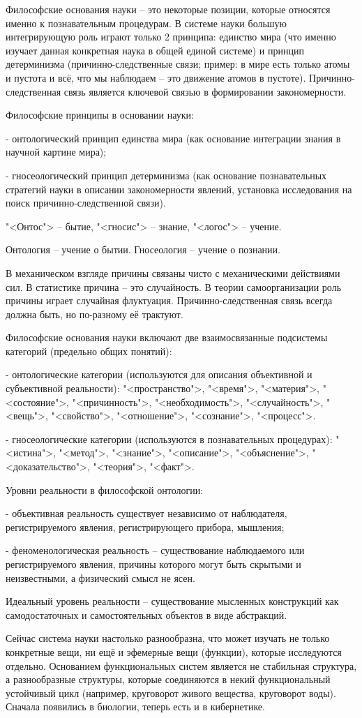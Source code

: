 \documentclass[exam_answers.tex]{subfiles}
\begin{document}
\renewcommand{\baselinestretch}{0.75}

Философские основания науки – это некоторые позиции, которые относятся именно к познавательным процедурам. В системе науки большую интегрирующую роль играют только 2 принципа: единство мира (что именно изучает данная конкретная наука в общей единой системе) и принцип детерминизма (причинно-следственные связи; пример: в мире есть только атомы и пустота и всё, что мы наблюдаем – это движение атомов в пустоте). Причинно-следственная связь является ключевой связью в формировании закономерности.

Философские принципы в основании науки:

- онтологический принцип единства мира (как основание интеграции знания в научной картине мира);

- гносеологический принцип детерминизма (как основание познавательных стратегий науки в описании закономерности явлений, установка исследования на поиск причинно-следственной связи).

"<Онтос"> -- бытие, "<гносис"> -- знание, "<логос"> -- учение.

Онтология – учение о бытии. Гносеология – учение о познании.

В механическом взгляде причины связаны чисто с механическими действиями сил. В статистике причина – это случайность. В теории самоорганизации роль причины играет случайная флуктуация. Причинно-следственная связь всегда должна быть, но по-разному её трактуют.

Философские основания науки включают две взаимосвязанные подсистемы категорий (предельно общих понятий):

- онтологические категории (используются для описания объективной и субъективной реальности): "<пространство">, "<время">, "<материя">, "<состояние">, "<причинность">, "<необходимость">, "<случайность">, "<вещь">, "<свойство">, "<отношение">, "<сознание">, "<процесс">.

- гносеологические категории (используются в познавательных процедурах): "<истина">, "<метод">, "<знание">, "<описание">, "<объяснение">, "<доказательство">, "<теория">, "<факт">.

Уровни реальности в философской онтологии:

- объективная реальность существует независимо от наблюдателя, регистрируемого явления, регистрирующего прибора, мышления;

- феноменологическая реальность – существование наблюдаемого или регистрируемого явления, причины которого могут быть скрытыми и неизвестными, а физический смысл не ясен.

Идеальный уровень реальности – существование мысленных конструкций как самодостаточных и самостоятельных объектов в виде абстракций.

Сейчас система науки настолько разнообразна, что может изучать не только конкретные вещи, ни ещё и эфемерные вещи (функции), которые исследуются отдельно.
Основанием функциональных систем является не стабильная структура, а разнообразные структуры, которые соединяются в некий функциональный устойчивый цикл (например, круговорот живого вещества, круговорот воды).
Сначала появились в биологии, теперь есть и в кибернетике.
\end{document}
